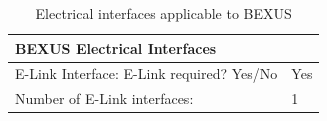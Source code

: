 \documentclass[ %
  a4paper, %
  11pt, %
  openany, %
  parskip, %
  toc=totoc, %
  listof=totoc, %
  bibliography=totoc %
]{scrreprt} %
\providecommand{\DIFdelbegin}{} %
\providecommand{\DIFaddbeginFL}{} %
\providecommand{\DIFaddendFL}{} %
\providecommand{\DIFdelbeginFL}{} %
\providecommand{\DIFdelendFL}{} %
\providecommand{\DIFscaledelfig}{0.5}
\newlength{\DIFdelgraphicswidth} %
\newlength{\DIFdelgraphicsheight} %
\providecommand{\DIFaddincludegraphics}[2][]{{\color{blue}\fbox{\DIFOincludegraphics[#1]{#2}}}} %
\providecommand{\DIFdelincludegraphics}[2][]{%
\sbox{\DIFdelgraphicsbox}{\DIFOincludegraphics[#1]{#2}}%
\settoboxwidth{\DIFdelgraphicswidth}{\DIFdelgraphicsbox} %
\settoboxtotalheight{\DIFdelgraphicsheight}{\DIFdelgraphicsbox} %
\scalebox{\DIFscaledelfig}{%
\parbox[b]{\DIFdelgraphicswidth}{\usebox{\DIFdelgraphicsbox}\\[-\baselineskip] \rule{\DIFdelgraphicswidth}{0em}}\llap{\resizebox{\DIFdelgraphicswidth}{\DIFdelgraphicsheight}{%
\setlength{\unitlength}{\DIFdelgraphicswidth}%
\begin{picture}(1,1)%
\thicklines\linethickness{2pt} %
{\color[rgb]{1,0,0}\put(0,0){\framebox(1,1){}}}%
{\color[rgb]{1,0,0}\put(0,0){\line( 1,1){1}}}%
{\color[rgb]{1,0,0}\put(0,1){\line(1,-1){1}}}%
\end{picture}%
}\hspace*{3pt}}} %
} %
\DeclareRobustCommand{\DIFdelbegin}{\DIFOdelbegin \let\includegraphics\DIFdelincludegraphics} %
\DeclareRobustCommand{\DIFaddbeginFL}{\DIFOaddbeginFL \let\includegraphics\DIFaddincludegraphics} %
\DeclareRobustCommand{\DIFaddendFL}{\DIFOaddendFL \let\includegraphics\DIFOincludegraphics} %
\DeclareRobustCommand{\DIFdelbeginFL}{\DIFOdelbeginFL \let\includegraphics\DIFdelincludegraphics} %
\DeclareRobustCommand{\DIFdelendFL}{\DIFOaddendFL \let\includegraphics\DIFOincludegraphics} %
\begin{document}
\DIFdelbegin %
\DIFdelendFL \DIFaddbeginFL \begin{table}[htbp]
\DIFaddendFL \centering
\caption{Electrical interfaces applicable to BEXUS}
\label{tab:electrical_interfaces_bexus}
\DIFdelbeginFL %
\DIFdelendFL \DIFaddbeginFL \begin{tabular}{p{10cm} p{5cm}}
\toprule
\multicolumn{2}{l}{\textbf{BEXUS Electrical Interfaces}} \\
\midrule
E-Link Interface: E-Link required? Yes/No & Yes\\
Number of E-Link interfaces: & 1 \\

\end{tabular}
\end{table}
\end{document}

